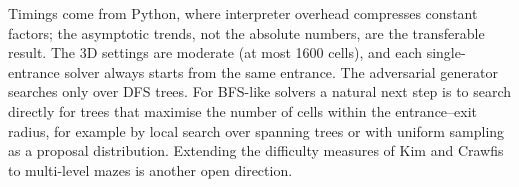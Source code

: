 Timings come from Python, where interpreter overhead compresses constant factors; the asymptotic trends, not the absolute numbers, are the transferable result.
The 3D settings are moderate (at most 1600 cells), and each single-entrance solver always starts from the same entrance.
The adversarial generator searches only over DFS trees.
For BFS-like solvers a natural next step is to search directly for trees that maximise the number of cells within the entrance--exit radius, for example by local search over spanning trees or with uniform sampling~\cite{wilson1996generating} as a proposal distribution.
Extending the difficulty measures of Kim and Crawfis~\cite{kim2015quest} to multi-level mazes is another open direction.
